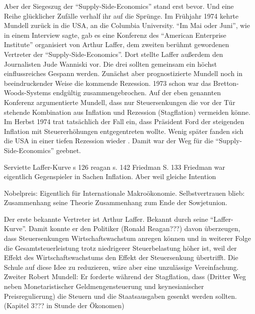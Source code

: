 Aber der Siegeszug der "`Supply-Side-Economics"' stand erst bevor. Und eine Reihe glücklicher Zufälle verhalf ihr auf die Sprünge. Im Frühjahr 1974 kehrte Mundell zurück in die USA, an die Columbia University. "`Im Mai oder Juni"', wie \textcite{Mundell1998} in einem Interview sagte, gab es eine Konferenz des "`American Enterprise Institute"' organisiert von Arthur Laffer, dem zweiten berühmt gewordenen Vertreter der "`Supply-Side-Economics"'. Dort stellte Laffer außerdem den Journalisten Jude Wanniski vor. Die drei sollten gemeinsam ein höchst einflussreiches Gespann werden. Zunächst aber prognostizierte Mundell noch in beeindruckender Weise die kommende Rezession. 1973 schon war das Bretton-Woods-Systems endgültig zusammengebrochen. Auf der eben genannten Konferenz argumentierte Mundell, dass nur Steuersenkungen die vor der Tür stehende Kombination aus Inflation und Rezession (Stagflation) vermeiden könne. Im Herbst 1974 trat tatsächlich der Fall ein, dass Präsident Ford der steigenden Inflation mit Steuererhöhungen entgegentreten wollte. Wenig später fanden sich die USA in einer tiefen Rezession wieder \parencite[S. 195]{Warsh}. Damit war der Weg für die "`Supply-Side-Economics"' geebnet.

Serviette Laffer-Kurve s 126
reagan s. 142
Friedman S. 133 Friedman war eigentlich Gegenspieler in Sachen Inflation. Aber weil gleiche Intention


Nobelpreis: Eigentlich für Internationale Makroökonomie. Selbstvertrauen blieb: Zusammenhang seine Theorie Zusammenhang zum Ende der Sowjetunion.





Der erste bekannte Vertreter ist Arthur Laffer. Bekannt durch seine "`Laffer-Kurve"'. Damit konnte er den Politiker (Ronald Reagan???) davon überzeugen, dass Steuersenkungen Wirtschaftswachstum anregen können und in weiterer Folge die Gesamtsteuerleistung trotz niedrigerer Steuerbelastung höher ist, weil der Effekt des Wirtschaftswachstums den Effekt der Steuersenkung übertrifft. Die Schule auf diese Idee zu reduzieren, wäre aber eine unzulässige Vereinfachung.
Zweiter Robert Mundell: Er forderte während der Stagflation, dass (Dritter Weg neben Monetaristischer Geldmengensteuerung und keynesianischer Preisregulierung) die Steuern und die Staatsausgaben gesenkt werden sollten. (Kapitel 3??? in Stunde der Ökonomen)










